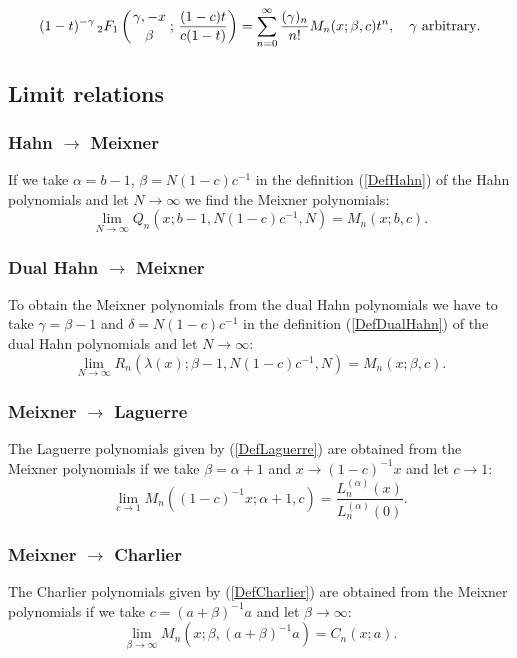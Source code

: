 \documentclass[envcountchap,graybox]{svmono}
\newcounter{rom}
\newcommand{\hyp}[5]{\mbox{}_{#1}{F}_{#2}
\left(\genfrac{}{}{0pt}{}{#3}{#4}\,;\,#5\right)}
\begin{document}
\begin{equation}
\label{GenMeixner3}
(1-t)^{-\gamma}\,\hyp{2}{1}{\gamma,-x}{\beta}{\frac{(1-c)t}{c(1-t)}}
=\sum_{n=0}^{\infty}\frac{(\gamma)_n}{n!}M_n(x;\beta,c)t^n,
\quad\textrm{$\gamma$ arbitrary}.
\end{equation}

\subsection*{Limit relations}

\subsubsection*{Hahn $\rightarrow$ Meixner}
If we take $\alpha=b-1$, $\beta=N(1-c)c^{-1}$ in the definition (\ref{DefHahn})
of the Hahn polynomials and let $N\rightarrow\infty$ we find the Meixner polynomials:
$$\lim_{N\rightarrow\infty}
Q_n(x;b-1,N(1-c)c^{-1},N)=M_n(x;b,c).$$

\subsubsection*{Dual Hahn $\rightarrow$ Meixner}
To obtain the Meixner polynomials from the dual Hahn polynomials we have to take
$\gamma=\beta-1$ and $\delta=N(1-c)c^{-1}$ in the definition (\ref{DefDualHahn}) of
the dual Hahn polynomials and let $N\rightarrow\infty$:
$$\lim_{N\rightarrow\infty}
R_n(\lambda(x);\beta-1,N(1-c)c^{-1},N)=M_n(x;\beta,c).$$

\subsubsection*{Meixner $\rightarrow$ Laguerre}
The Laguerre polynomials given by (\ref{DefLaguerre}) are obtained from the Meixner polynomials
if we take $\beta=\alpha+1$ and $x\rightarrow (1-c)^{-1}x$ and let $c\rightarrow 1$:
\begin{equation}
\lim_{c\rightarrow 1}
M_n((1-c)^{-1}x;\alpha+1,c)=\frac{L_n^{(\alpha)}(x)}{L_n^{(\alpha)}(0)}.
\end{equation}

\subsubsection*{Meixner $\rightarrow$ Charlier}
The Charlier polynomials given by (\ref{DefCharlier}) are obtained from the Meixner polynomials
if we take $c=(a+\beta)^{-1}a$ and let $\beta\rightarrow\infty$:
\begin{equation}
\lim_{\beta\rightarrow\infty}
M_n(x;\beta,(a+\beta)^{-1}a)=C_n(x;a).
\end{equation}
\end{document}
